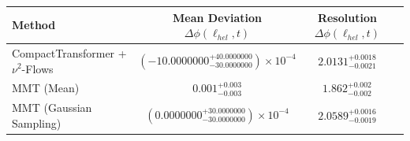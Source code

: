     \begin{tabular}{lccc}
        \toprule
        Method & Mean Deviation $\Delta\phi(\ell_{hel}, t)$ & Resolution $\Delta\phi(\ell_{hel}, t)$ \\
        \midrule
        CompactTransformer + $\nu^2$-Flows & $(-10.0000000^{+40.0000000}_{-30.0000000})\times 10^{-4}$ & $2.0131^{+0.0018}_{-0.0021}$ \\
        MMT (Mean) & $0.001^{+0.003}_{-0.003}$ & $1.862^{+0.002}_{-0.002}$ \\
        MMT (Gaussian Sampling) & $(0.0000000^{+30.0000000}_{-30.0000000})\times 10^{-4}$ & $2.0589^{+0.0016}_{-0.0019}$ \\
        \bottomrule
    \end{tabular}